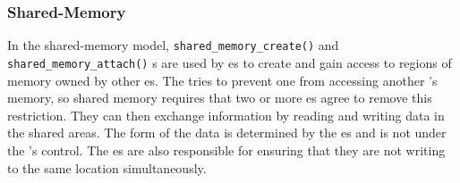 \subsubsection{Shared-Memory}\label{subsubsec:Shared_Memory}
In the shared-memory model, \texttt{shared_memory_create()} and \texttt{shared_memory_attach()} s are used by es to create and gain access to regions of memory owned by other es.
The  tries to prevent one  from accessing another ’s memory, so shared memory requires that two or more es agree to remove this restriction.
They can then exchange information by reading and writing data in the shared areas.
The form of the data is determined by the es and is not under the ’s control.
The es are also responsible for ensuring that they are not writing to the same location simultaneously.

